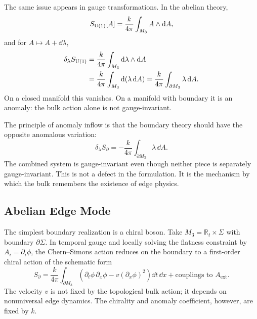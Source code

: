 The same issue appears in gauge transformations. In the abelian theory,
\begin{equation}
  S_{\operatorname{U}(1)}[A]
  =
  \frac{k}{4\pi}\int_{M_3}A\wedge\mathrm{d} A,
  \label{eq:anomaly-abelian-action}
\end{equation}
and for $A\mapsto A+\dd\lambda$,
\begin{align}
  \delta_\lambda S_{\operatorname{U}(1)}
  &=
  \frac{k}{4\pi}\int_{M_3}
  \mathrm{d}\lambda\wedge\mathrm{d} A
  \notag\\
  &=
  \frac{k}{4\pi}\int_{M_3}
  \mathrm{d}(\lambda\,\mathrm{d} A)
  =
  \frac{k}{4\pi}\int_{\partial M_3}
  \lambda\,\mathrm{d} A.
  \label{eq:anomaly-boundary-gauge-variation}
\end{align}
On a closed manifold this vanishes. On a manifold with boundary it is an anomaly: the bulk action alone is not gauge-invariant.

The principle of anomaly inflow is that the boundary theory should have the opposite anomalous variation:
\begin{equation}
  \delta_\lambda S_{\partial}
  =
  -
  \frac{k}{4\pi}\int_{\partial M_3}\lambda\,\dd A.
  \label{eq:anomaly-boundary-cancel}
\end{equation}
The combined system is gauge-invariant even though neither piece is separately gauge-invariant. This is not a defect in the formulation. It is the mechanism by which the bulk remembers the existence of edge physics.


\subsection{Abelian Edge Mode}
\label{subsec:abelian-edge-mode}

The simplest boundary realization is a chiral boson. Take $M_3=\mathbb R_t\times\Sigma$ with boundary $\partial\Sigma$. In temporal gauge and locally solving the flatness constraint by $A_i=\partial_i\phi$, the Chern--Simons action reduces on the boundary to a first-order chiral action of the schematic form
\begin{equation}
  S_{\partial}
  =
  \frac{k}{4\pi}\int_{\partial M_3}
  \left(\partial_t\phi\,\partial_x\phi
  -
  v(\partial_x\phi)^2\right)\dd t\,\dd x
  +
  \text{couplings to }A_{\mathrm{ext}}.
  \label{eq:anomaly-chiral-boson}
\end{equation}
The velocity $v$ is not fixed by the topological bulk action; it depends on nonuniversal edge dynamics. The chirality and anomaly coefficient, however, are fixed by $k$.

